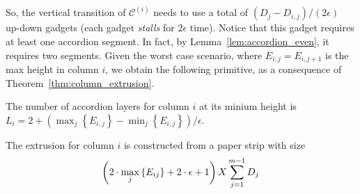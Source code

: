 So, the vertical transition of $\mathcal C^{(i)}$ needs to use a total of $\left( D_j - D_{i,j}\right)/\left( 2\epsilon\right)$
up-down gadgets (each gadget \emph{stalls} for $2\epsilon$ time).
Notice that this gadget requires at least one accordion segment. In fact, by Lemma~\ref{lem:accordion_even}, it requires two segments.
Given the worst case scenario, where $E_{i,j}=E_{i,j+1}$ is the max height in column $i$,
we obtain the following primitive, as a consequence of Theorem~\ref{thm:column_extrusion}.

\begin{proposition}
\label{prop:accordion_layers}
The number of accordion layers for column $i$ at its minium height is
$L_i = 2 + \left( \max_j\left\{ E_{i,j}\right\} - \min_j\left\{ E_{i,j}\right\} \right)/\epsilon$.
\end{proposition}

\begin{corollary}
\label{cor:accordion_layers}
The extrusion for column $i$ is constructed from a paper strip with size
$$\left( 2\cdot\max_j\left\{ E_{ij}\right\}+ 2\cdot\epsilon + 1\right) \sc{X} \sum\limits^{m-1}_{j=1} D_j$$
\end{corollary}

